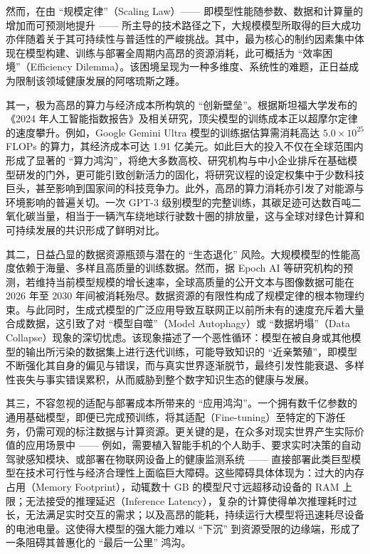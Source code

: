 \documentclass[../main.tex]{subfiles}
\begin{document}
然而，在由 “规模定律”（Scaling Law）—— 即模型性能随参数、数据和计算量的增加而可预测地提升 —— 所主导的技术路径之下，大规模模型所取得的巨大成功亦伴随着关于其可持续性与普适性的严峻挑战。其中，最为核心的制约因素集中体现在模型构建、训练与部署全周期内高昂的资源消耗，此可概括为 “效率困境”（Efficiency Dilemma）。该困境呈现为一种多维度、系统性的难题，正日益成为限制该领域健康发展的阿喀琉斯之踵。

其一，极为高昂的算力与经济成本所构筑的 “创新壁垒”。根据斯坦福大学发布的《2024 年人工智能指数报告》及相关研究，顶尖模型的训练成本正以超摩尔定律的速度攀升。例如，Google Gemini Ultra 模型的训练据估算需消耗高达 $5.0 \times 10^{25}$ FLOPs 的算力，其经济成本可达 1.91 亿美元。如此巨大的投入不仅在全球范围内形成了显著的 “算力鸿沟”，将绝大多数高校、研究机构与中小企业排斥在基础模型研发的门外，更可能引致创新活力的固化，将研究议程的设定权集中于少数科技巨头，甚至影响到国家间的科技竞争力。此外，高昂的算力消耗亦引发了对能源与环境影响的普遍关切。一次 GPT-3 级别模型的完整训练，其碳足迹可达数百吨二氧化碳当量，相当于一辆汽车绕地球行驶数十圈的排放量，这与全球对绿色计算和可持续发展的共识形成了鲜明对比。

其二，日益凸显的数据资源瓶颈与潜在的 “生态退化” 风险。大规模模型的性能高度依赖于海量、多样且高质量的训练数据。然而，据 Epoch AI 等研究机构的预测，若维持当前模型规模的增长速率，全球高质量的公开文本与图像数据可能在 2026 年至 2030 年间被消耗殆尽。数据资源的有限性构成了规模定律的根本物理约束。与此同时，生成式模型的广泛应用导致互联网正以前所未有的速度充斥着大量合成数据，这引致了对 “模型自噬”（Model Autophagy）或 “数据坍塌”（Data Collapse）现象的深切忧虑。该现象描述了一个恶性循环：模型在被自身或其他模型的输出所污染的数据集上进行迭代训练，可能导致知识的 “近亲繁殖”，即模型不断强化其自身的偏见与错误，而与真实世界逐渐脱节，最终引发性能衰退、多样性丧失与事实错误累积，从而威胁到整个数字知识生态的健康与发展。

其三，不容忽视的适配与部署成本所带来的 “应用鸿沟”。一个拥有数千亿参数的通用基础模型，即便已完成预训练，将其适配（Fine-tuning）至特定的下游任务，仍需可观的标注数据与计算资源。更关键的是，在众多对现实世界产生实际价值的应用场景中 —— 例如，需要植入智能手机的个人助手、要求实时决策的自动驾驶感知模块、或部署在物联网设备上的健康监测系统 —— 直接部署此类巨型模型在技术可行性与经济合理性上面临巨大障碍。这些障碍具体体现为：过大的内存占用（Memory Footprint），动辄数十 GB 的模型尺寸远超移动设备的 RAM 上限；无法接受的推理延迟（Inference Latency），复杂的计算使得单次推理耗时过长，无法满足实时交互的需求；以及高昂的能耗，持续运行大模型将迅速耗尽设备的电池电量。这使得大模型的强大能力难以 “下沉” 到资源受限的边缘端，形成了一条阻碍其普惠化的 “最后一公里” 鸿沟。
\end{document}
